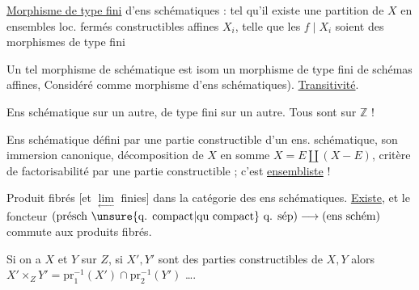 
\uline{Morphisme de type fini}  d'ens schématiques : tel qu'il existe une partition de $X$ en ensembles loc. fermés constructibles affines $X_i$, telle que les $f\mid X_i$ soient des morphismes de type fini 


Un tel morphisme de  schématique est isom  un morphisme de type fini de schémas affines, Considéré comme morphisme d'ens schématiques). \uline{Transitivité}.

Ens schématique sur un autre, de type fini sur un autre. Tous sont sur $\mathbb{Z}$ !

Ens schématique défini par une partie constructible d'un ens. schématique, son immersion canonique, décomposition de $X$ en somme $X=E\amalg(X-E)$, critère de factorisabilité par une partie constructible ; c'est \uline{ensembliste} !

Produit fibrés [et $\underset{\leftarrow}{\lim}$ finies] dans la catégorie des ens schématiques. \uline{Existe}, et le foncteur  $(\text{présch }\unsure{\text{q. compact}|\text{qu compact}}\ \text{q. sép})\longrightarrow(\text{ens schém})$ commute aux produits fibrés.

Si on a $X$ et $Y$ sur $Z$, si $X',Y'$ sont des parties constructibles de $X,Y$ alors $X'\times_Z Y'=\mathrm{pr}_1^{-1}(X')\cap\mathrm{pr}_2^{-1}(Y')$ \ldots.
